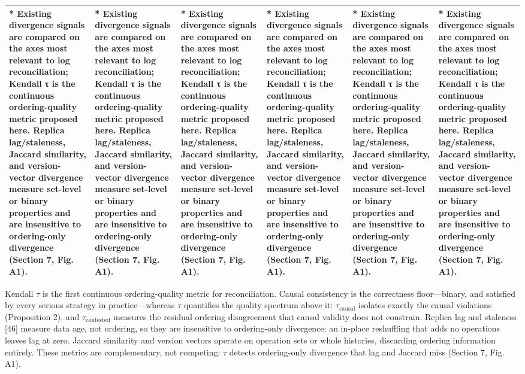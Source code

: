 \documentclass[11pt]{article}
\begin{document}
\begin{table}[t]
{\begin{tabular}{llllll}
* Existing divergence signals are compared on the axes most relevant to log reconciliation; Kendall τ is the continuous ordering-quality metric proposed here. Replica lag/staleness, Jaccard similarity, and version-vector divergence measure set-level or binary properties and are insensitive to ordering-only divergence (Section 7, Fig. A1). & * Existing divergence signals are compared on the axes most relevant to log reconciliation; Kendall τ is the continuous ordering-quality metric proposed here. Replica lag/staleness, Jaccard similarity, and version-vector divergence measure set-level or binary properties and are insensitive to ordering-only divergence (Section 7, Fig. A1). & * Existing divergence signals are compared on the axes most relevant to log reconciliation; Kendall τ is the continuous ordering-quality metric proposed here. Replica lag/staleness, Jaccard similarity, and version-vector divergence measure set-level or binary properties and are insensitive to ordering-only divergence (Section 7, Fig. A1). & * Existing divergence signals are compared on the axes most relevant to log reconciliation; Kendall τ is the continuous ordering-quality metric proposed here. Replica lag/staleness, Jaccard similarity, and version-vector divergence measure set-level or binary properties and are insensitive to ordering-only divergence (Section 7, Fig. A1). & * Existing divergence signals are compared on the axes most relevant to log reconciliation; Kendall τ is the continuous ordering-quality metric proposed here. Replica lag/staleness, Jaccard similarity, and version-vector divergence measure set-level or binary properties and are insensitive to ordering-only divergence (Section 7, Fig. A1). & * Existing divergence signals are compared on the axes most relevant to log reconciliation; Kendall τ is the continuous ordering-quality metric proposed here. Replica lag/staleness, Jaccard similarity, and version-vector divergence measure set-level or binary properties and are insensitive to ordering-only divergence (Section 7, Fig. A1). \\
\hline
\end{tabular}
}
\end{table}

Kendall $\tau $ is the first continuous ordering-quality metric for reconciliation. Causal consistency is the correctness floor—binary, and satisfied by every serious strategy in practice—whereas $\tau $ quantifies the quality spectrum above it: $\tau _{\mathrm{causal}}$ isolates exactly the causal violations (Proposition 2), and $\tau _{\mathrm{contested}}$ measures the residual ordering disagreement that causal validity does not constrain. Replica lag and staleness [46] measure data age, not ordering, so they are insensitive to ordering-only divergence: an in-place reshuffling that adds no operations leaves lag at zero. Jaccard similarity and version vectors operate on operation sets or whole histories, discarding ordering information entirely. These metrics are complementary, not competing: $\tau $ detects ordering-only divergence that lag and Jaccard miss (Section 7, Fig. A1).
\end{document}
